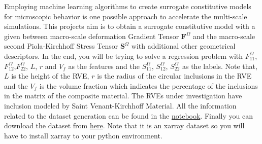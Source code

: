 \documentclass{article}
\begin{document}
Employing machine learning algorithms to create surrogate constitutive models for microscopic behavior is one possible approach \cite{Bessa2017} to accelerate the multi-scale simulations. This projects aim is to obtain a surrogate constitutive model with a given between macro-scale deformation Gradient Tensor $\mathbf{F}^\Omega$ and the macro-scale second Piola-Kirchhoff Stress Tensor $\mathbf{S}^\Omega$ with additional other geometrical descriptors. In the end, you will be trying to solve a regression problem with $F^\Omega_{11}$, $F^\Omega_{12}$,$F^\Omega_{22}$, $L$, $r$ and $V_f$ as the features and the $S^\Omega_{11}$, $S^\Omega_{12}$, $S^\Omega_{22}$ as the labels. Note that, $L$ is the height of the RVE, $r$ is the radius of the circular inclusions in the RVE and the $V_f$ is the volume fraction which indicates the percentage of the inclusions in the matrix of the composite material. The RVEs under investigation have inclusion modeled by Saint Venant-Kirchhoff Material. All the information related to the dataset generation can be found in the \href{https://colab.research.google.com/drive/10lQ9XWTf4hbG90JCAbc9ZNtRkwQggVYz}{notebook}. Finally you can download the dataset from \href{https://github.com/taylanot/DDSCT/blob/main/examples/dataset.sim}{here}. Note that it is an xarray dataset so you will have to install xarray to your python environment.




\end{document}
